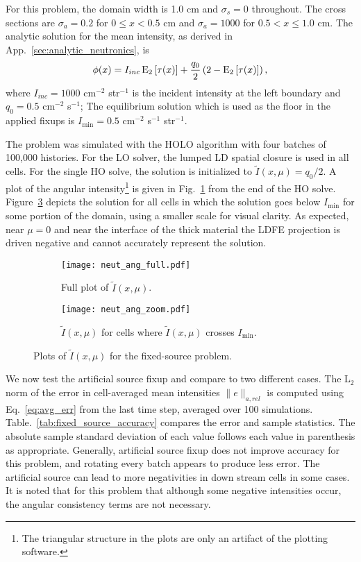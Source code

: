For this problem, the domain width is 1.0 cm and $\sigma_s=0$ throughout.  The cross
sections are $\sigma_a=0.2$ \invcm for $0\leq x <0.5$ cm and $\sigma_a=1000$ for
$0.5<x\leq1.0$ cm.  The analytic solution
for the mean intensity, as derived in App.~\ref{sec:analytic_neutronics}, is
\begin{equation}
    \phi(x) = I_{inc}\operatorname{E}_{2}\left[\tau(x)\right] + \frac{q_0}{2} \left(2 -
    \operatorname{E}_{2}\left[\tau(x)\right]\right),
\end{equation}
where $I_{inc}=1000$ cm$^{-2}$ str$^{-1}$ is the incident intensity at the left
boundary and $q_0 = 0.5$ cm$^{-2}$ s$^{-1}$; The equilibrium solution which is
used as the floor in the applied fixups is $I_{\min} = 0.5$ cm$^{-2}$ s$^{-1}$ str$^{-1}$.

The problem was simulated with the HOLO algorithm with four batches of 100,000 histories.
For the LO solver, the lumped LD spatial closure is used in all cells.
For the single HO solve, the solution is initialized to $\tilde I(x,\mu)=q_0/2$.
A plot of the angular
intensity\footnote{The triangular structure in the plots are only an artifact of the plotting
software.} is given in Fig.~\ref{fig:neut_ang_full} from the end of the HO solve.
Figure~\ref{fig:neut_ang_zoom} depicts the solution for all cells in which the solution goes
below $I_{\min}$ for some portion of the domain, using a smaller scale for visual clarity.
As expected, near $\mu=0$ and near the interface of the thick material the LDFE projection
is driven negative and cannot accurately represent the solution.
\begin{figure}[hp]
    \centering
\begin{subfigure}{0.7\textwidth}
  \centering
    \texttt{[image: neut\_ang\_full.pdf]}
    \caption{\label{fig:neut_ang_full} Full plot of $\tilde I(x,\mu)$.}
\end{subfigure}
\begin{subfigure}{0.7\textwidth}
  \centering
  \texttt{[image: neut\_ang\_zoom.pdf]}
  \caption{\label{fig:neut_ang_zoom} $\tilde I(x,\mu)$ for cells where $\tilde I(x,\mu)$
  crosses $I_{\min}$.   }
\end{subfigure}
\caption{Plots of $\tilde I(x,\mu)$ for the fixed-source problem.}
\end{figure}

We now test the artificial source fixup and compare to two different cases.  The L$_2$
norm of the error in cell-averaged mean intensities $\|e\|_{a,rel}$ is computed using
Eq.~\eqref{eq:avg_err} from the last time step, averaged over 100
simulations.  Table.~\ref{tab:fixed_source_accuracy} compares the error and sample
statistics.  The absolute sample standard deviation of each value follows each value in parenthesis 
as appropriate.  Generally, artificial source fixup does not improve accuracy for this problem, and
rotating every batch appears to produce less error.  The artificial source can lead to
more negativities in down stream cells in some cases.  It is noted that for
this problem that although some negative intensities occur, the angular consistency terms
are not necessary.  

